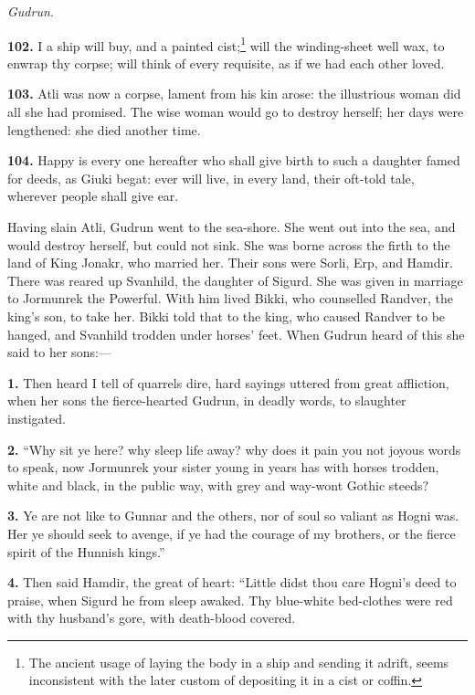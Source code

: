 \emph{Gudrun.}

\textbf{102.} I a ship will buy, and a painted cist;\footnote{The ancient usage of laying the body in a ship and
sending it adrift, seems inconsistent with the later custom of
depositing it in a cist or coffin.} will the
winding-sheet well wax, to enwrap thy corpse; will think of every
requisite, as if we had each other loved.

\textbf{103.} Atli was now a corpse, lament from his kin arose: the
illustrious woman did all she had promised. The wise woman would go to
destroy herself; her days were lengthened: she died another time.

\textbf{104.} Happy is every one hereafter who shall give birth to such a
daughter famed for deeds, as Giuki begat: ever will live, in every
land, their oft-told tale, wherever people shall give ear.


Having slain Atli, Gudrun went to the sea-shore. She went out into the
sea, and would destroy herself, but could not sink. She was borne
across the firth to the land of King Jonakr, who married her. Their
sons were Sorli, Erp, and Hamdir. There was reared up Svanhild, the
daughter of Sigurd. She was given in marriage to Jormunrek the
Powerful. With him lived Bikki, who counselled Randver, the king's
son, to take her. Bikki told that to the king, who caused Randver to
be hanged, and Svanhild trodden under horses' feet. When Gudrun heard
of this she said to her sons:—

\textbf{1.} Then heard I tell of quarrels dire, hard sayings uttered from
great affliction, when her sons the fierce-hearted Gudrun, in deadly
words, to slaughter instigated.

\textbf{2.} ``Why sit ye here? why sleep life away? why does it pain you not
joyous words to speak, now Jormunrek your sister young in years has
with horses trodden, white and black, in the public way, with grey and
way-wont Gothic steeds?

\textbf{3.} Ye are not like to Gunnar and the others, nor of soul so valiant
as Hogni was. Her ye should seek to avenge, if ye had the courage of
my brothers, or the fierce spirit of the Hunnish kings.''

\textbf{4.} Then said Hamdir, the great of heart: ``Little didst thou care
Hogni's deed to praise, when Sigurd he from sleep awaked. Thy
blue-white bed-clothes were red with thy husband's gore, with
death-blood covered.

